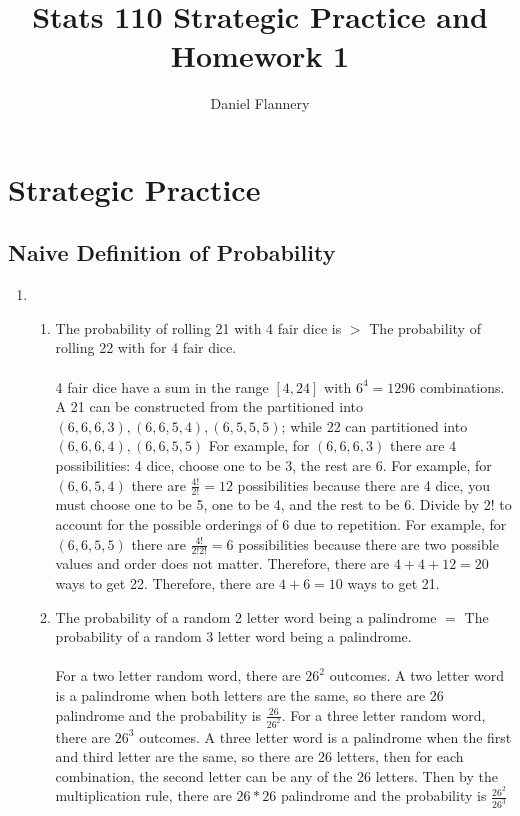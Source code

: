 \documentclass[11pt, oneside]{article}   	%
\title{Stats 110 Strategic Practice and Homework 1}
\author{Daniel Flannery}
\begin{document}
\maketitle
\section{Strategic Practice}
\subsection{Naive Definition of Probability}
	\begin{enumerate}
		\item 
			\begin{enumerate}
			\item The probability of rolling 21  with 4 fair dice is $>$ The probability of rolling 22 with for 4 fair dice.\\\\
			4 fair dice have a sum in the range $[4, 24]$ with $6^4 = 1296$ combinations.
			A 21 can be constructed from the partitioned into $(6, 6, 6, 3), (6, 6, 5, 4), (6, 5, 5, 5)$; while 22 can partitioned into $(6, 6, 6, 4), (6, 6, 5, 5)$
			For example, for $(6, 6, 6, 3)$ there are $4$ possibilities: 4 dice, choose one to be 3, the rest are 6.
			For example, for $(6, 6, 5, 4)$ there are $\frac{4!}{2!} = 12$ possibilities because there are 4 dice, you must choose one to be 5, one to be 4, and the rest to be 6. Divide by $2!$ to account for the possible orderings of 6 due to repetition.
			For example, for $(6, 6, 5, 5)$ there are $\frac{4!}{2! 2!} = 6$ possibilities because there are two possible values and order does not matter.
			Therefore, there are $4 + 4 + 12 = 20$ ways to get 22.
			Therefore, there are $4 + 6 = 10$ ways to get 21.
			\item The probability of a random 2 letter word being a palindrome $=$ The probability of a random 3 letter word being a palindrome.\\\\
			For a two letter random word, there are $26^2$ outcomes. A two letter word is a palindrome when both letters are the same, so there are 26 palindrome and the probability is $\frac{26}{26^2}$.
			For a three letter random word, there are $26^3$ outcomes. A three letter word is a palindrome when the first and third letter are the same, so there are 26 letters, then for each combination, the second letter can be any of the 26 letters.
			Then by the multiplication rule, there are $26 * 26$ palindrome and the probability is $\frac{26^2}{26^3}$

\end{enumerate}
\end{enumerate}
\end{document}
